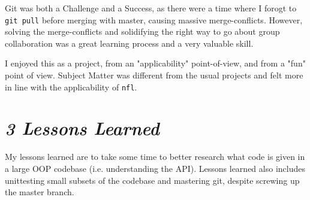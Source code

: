\documentclass[11pt]{extbook}
\newcommand\tab[1][1cm]{\hspace*{#1}}
\begin{document}
\tab Git was both a Challenge and a Success, as there were a time where I 
forogt to \verb|git pull| before merging with master, causing massive 
merge-conflicts. However, solving the merge-conflicts and solidifying the right
way to go about group collaboration was a great learning process and a very
valuable skill.

\tab I enjoyed this as a project, from an "applicability" point-of-view, and 
from a "fun" point of view. Subject Matter was different from the usual
projects and felt more in line with the applicability of \verb|nfl|.

\section{\emph{3 Lessons Learned}}

\tab My lessons learned are to take some time to better research what code is 
given in a large OOP codebase (i.e. understanding the API). Lessons learned 
also includes unittesting small subsets of the codebase and mastering git,
despite screwing up the master branch.
\end{document}
